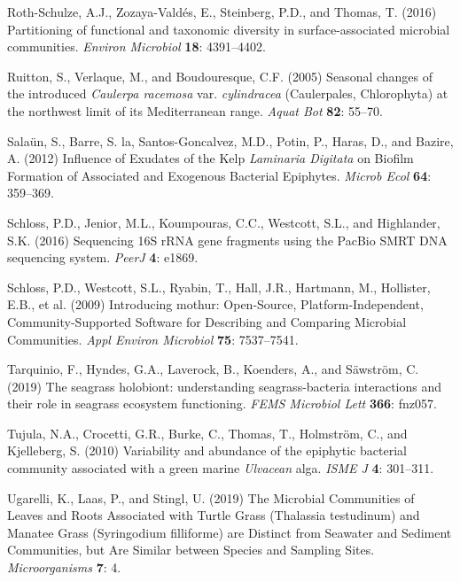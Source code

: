 \documentclass[12pt,]{article}
\begin{document}
\leavevmode\hypertarget{ref-Roth-Schulze2016}{}%
Roth-Schulze, A.J., Zozaya-Valdés, E., Steinberg, P.D., and Thomas, T.
(2016) Partitioning of functional and taxonomic diversity in
surface-associated microbial communities. \emph{Environ Microbiol}
\textbf{18}: 4391--4402.

\leavevmode\hypertarget{ref-Ruitton2005}{}%
Ruitton, S., Verlaque, M., and Boudouresque, C.F. (2005) Seasonal
changes of the introduced \emph{Caulerpa racemosa} var.
\emph{cylindracea} (Caulerpales, Chlorophyta) at the northwest limit of
its Mediterranean range. \emph{Aquat Bot} \textbf{82}: 55--70.

\leavevmode\hypertarget{ref-Salaun2012}{}%
Salaün, S., Barre, S. la, Santos-Goncalvez, M.D., Potin, P., Haras, D.,
and Bazire, A. (2012) Influence of Exudates of the Kelp \emph{Laminaria
Digitata} on Biofilm Formation of Associated and Exogenous Bacterial
Epiphytes. \emph{Microb Ecol} \textbf{64}: 359--369.

\leavevmode\hypertarget{ref-Schloss2016a}{}%
Schloss, P.D., Jenior, M.L., Koumpouras, C.C., Westcott, S.L., and
Highlander, S.K. (2016) Sequencing 16S rRNA gene fragments using the
PacBio SMRT DNA sequencing system. \emph{PeerJ} \textbf{4}: e1869.

\leavevmode\hypertarget{ref-Schloss2009}{}%
Schloss, P.D., Westcott, S.L., Ryabin, T., Hall, J.R., Hartmann, M.,
Hollister, E.B., et al. (2009) Introducing mothur: Open-Source,
Platform-Independent, Community-Supported Software for Describing and
Comparing Microbial Communities. \emph{Appl Environ Microbiol}
\textbf{75}: 7537--7541.

\leavevmode\hypertarget{ref-Tarquinio2019}{}%
Tarquinio, F., Hyndes, G.A., Laverock, B., Koenders, A., and Säwström,
C. (2019) The seagrass holobiont: understanding seagrass-bacteria
interactions and their role in seagrass ecosystem functioning.
\emph{FEMS Microbiol Lett} \textbf{366}: fnz057.

\leavevmode\hypertarget{ref-Tujula2010}{}%
Tujula, N.A., Crocetti, G.R., Burke, C., Thomas, T., Holmström, C., and
Kjelleberg, S. (2010) Variability and abundance of the epiphytic
bacterial community associated with a green marine \emph{Ulvacean} alga.
\emph{ISME J} \textbf{4}: 301--311.

\leavevmode\hypertarget{ref-Ugarelli2019}{}%
Ugarelli, K., Laas, P., and Stingl, U. (2019) The Microbial Communities
of Leaves and Roots Associated with Turtle Grass (Thalassia testudinum)
and Manatee Grass (Syringodium filliforme) are Distinct from Seawater
and Sediment Communities, but Are Similar between Species and Sampling
Sites. \emph{Microorganisms} \textbf{7}: 4.
\end{document}
